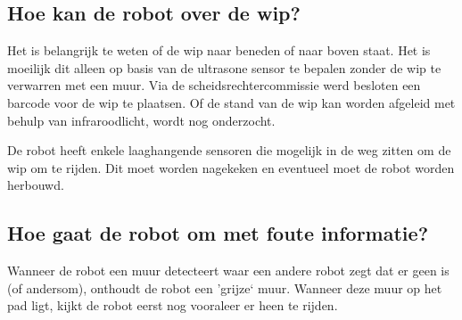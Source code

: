 \documentclass{peno}
\begin{document}
\subsection*{Hoe kan de robot over de wip?}
Het is belangrijk te weten of de wip naar beneden of naar boven staat. Het is moeilijk dit alleen op basis van de ultrasone sensor te bepalen zonder de wip te verwarren met een muur. Via de scheidsrechtercommissie werd besloten een barcode voor de wip te plaatsen. Of de stand van de wip kan worden afgeleid met behulp van infraroodlicht, wordt nog onderzocht.

De robot heeft enkele laaghangende sensoren die mogelijk in de weg zitten om de wip om te rijden. Dit moet worden nagekeken en eventueel moet de robot worden herbouwd.

\subsection*{Hoe gaat de robot om met foute informatie?}
Wanneer de robot een muur detecteert waar een andere robot zegt dat er geen is (of andersom), onthoudt de robot een 'grijze` muur. Wanneer deze muur op het pad ligt, kijkt de robot eerst nog vooraleer er heen te rijden.
\end{document}
